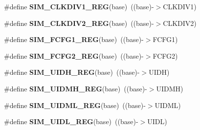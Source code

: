\begin{DoxyCompactItemize}
\item 
\#define {\bfseries S\+I\+M\+\_\+\+C\+L\+K\+D\+I\+V1\+\_\+\+R\+EG}(base)~((base)-\/$>$C\+L\+K\+D\+I\+V1)\hypertarget{group__SIM__Register__Accessor__Macros_gaa05276138d6ba426d9977f62fa12d659}{}\label{group__SIM__Register__Accessor__Macros_gaa05276138d6ba426d9977f62fa12d659}

\item 
\#define {\bfseries S\+I\+M\+\_\+\+C\+L\+K\+D\+I\+V2\+\_\+\+R\+EG}(base)~((base)-\/$>$C\+L\+K\+D\+I\+V2)\hypertarget{group__SIM__Register__Accessor__Macros_ga3042199ec3bde281552071431b9adf41}{}\label{group__SIM__Register__Accessor__Macros_ga3042199ec3bde281552071431b9adf41}

\item 
\#define {\bfseries S\+I\+M\+\_\+\+F\+C\+F\+G1\+\_\+\+R\+EG}(base)~((base)-\/$>$F\+C\+F\+G1)\hypertarget{group__SIM__Register__Accessor__Macros_gaa218fdd61f5d04088d7fa1cbec4ba9a9}{}\label{group__SIM__Register__Accessor__Macros_gaa218fdd61f5d04088d7fa1cbec4ba9a9}

\item 
\#define {\bfseries S\+I\+M\+\_\+\+F\+C\+F\+G2\+\_\+\+R\+EG}(base)~((base)-\/$>$F\+C\+F\+G2)\hypertarget{group__SIM__Register__Accessor__Macros_ga28d588cd36812f942a01c0ee0ad1beb0}{}\label{group__SIM__Register__Accessor__Macros_ga28d588cd36812f942a01c0ee0ad1beb0}

\item 
\#define {\bfseries S\+I\+M\+\_\+\+U\+I\+D\+H\+\_\+\+R\+EG}(base)~((base)-\/$>$U\+I\+DH)\hypertarget{group__SIM__Register__Accessor__Macros_gacb530eb0afb199280e2d3d1aec55b0dc}{}\label{group__SIM__Register__Accessor__Macros_gacb530eb0afb199280e2d3d1aec55b0dc}

\item 
\#define {\bfseries S\+I\+M\+\_\+\+U\+I\+D\+M\+H\+\_\+\+R\+EG}(base)~((base)-\/$>$U\+I\+D\+MH)\hypertarget{group__SIM__Register__Accessor__Macros_ga1f5eac1bbac9b6798958b4697632ef21}{}\label{group__SIM__Register__Accessor__Macros_ga1f5eac1bbac9b6798958b4697632ef21}

\item 
\#define {\bfseries S\+I\+M\+\_\+\+U\+I\+D\+M\+L\+\_\+\+R\+EG}(base)~((base)-\/$>$U\+I\+D\+ML)\hypertarget{group__SIM__Register__Accessor__Macros_ga7c4e741241b9fc954f2cd568d29b6b45}{}\label{group__SIM__Register__Accessor__Macros_ga7c4e741241b9fc954f2cd568d29b6b45}

\item 
\#define {\bfseries S\+I\+M\+\_\+\+U\+I\+D\+L\+\_\+\+R\+EG}(base)~((base)-\/$>$U\+I\+DL)\hypertarget{group__SIM__Register__Accessor__Macros_gac4adca94e35e9cb122f6e0f80510708f}{}\label{group__SIM__Register__Accessor__Macros_gac4adca94e35e9cb122f6e0f80510708f}


\end{DoxyCompactItemize}

